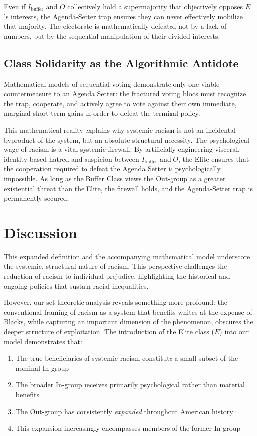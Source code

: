 \documentclass[12pt,openany]{book}
\begin{document}
Even if $I_{\text{buffer}}$ and $O$ collectively hold a supermajority that objectively opposes $E$'s interests, the Agenda-Setter trap ensures they can never effectively mobilize that majority. The electorate is mathematically defeated not by a lack of numbers, but by the sequential manipulation of their divided interests.

\section{Class Solidarity as the Algorithmic Antidote}

Mathematical models of sequential voting demonstrate only one viable countermeasure to an Agenda Setter: the fractured voting blocs must recognize the trap, cooperate, and actively agree to vote against their own immediate, marginal short-term gains in order to defeat the terminal policy.

This mathematical reality explains why systemic racism is not an incidental byproduct of the system, but an absolute structural necessity. The psychological wage of racism is a vital systemic firewall. By artificially engineering visceral, identity-based hatred and suspicion between $I_{\text{buffer}}$ and $O$, the Elite ensures that the cooperation required to defeat the Agenda Setter is psychologically impossible. As long as the Buffer Class views the Out-group as a greater existential threat than the Elite, the firewall holds, and the Agenda-Setter trap is permanently secured.

\chapter{Discussion}

This expanded definition and the accompanying mathematical model underscore the systemic, structural nature of racism. This perspective challenges the reduction of racism to individual prejudice, highlighting the historical and ongoing policies that sustain racial inequalities.

However, our set-theoretic analysis reveals something more profound: the conventional framing of racism as a system that benefits whites at the expense of Blacks, while capturing an important dimension of the phenomenon, obscures the deeper structure of exploitation. The introduction of the Elite class ($E$) into our model demonstrates that:

\begin{enumerate}
    \item The true beneficiaries of systemic racism constitute a small subset of the nominal In-group
    \item The broader In-group receives primarily psychological rather than material benefits
    \item The Out-group has consistently \textit{expanded} throughout American history
    \item This expansion increasingly encompasses members of the former In-group
\end{enumerate}
\end{document}
